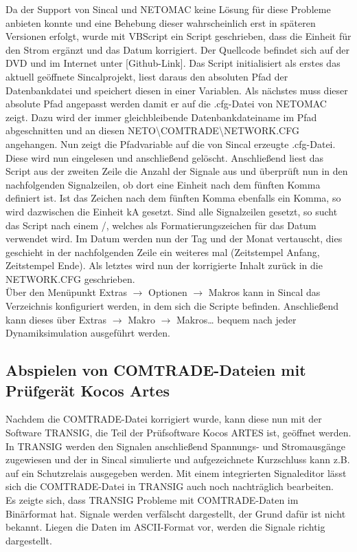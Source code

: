 \documentclass{scrartcl}
\begin{document}
\begin{onehalfspace}
Da der Support von Sincal und NETOMAC keine Lösung für diese Probleme anbieten konnte und eine Behebung dieser wahrscheinlich erst in späteren Versionen erfolgt, wurde mit VBScript ein Script geschrieben, dass die Einheit für den Strom ergänzt und das Datum korrigiert. Der Quellcode befindet sich auf der DVD und im Internet unter [Github-Link]. Das Script initialisiert als erstes das aktuell geöffnete Sincalprojekt, liest daraus den absoluten Pfad der Datenbankdatei und speichert diesen in einer Variablen. Als nächstes muss dieser absolute Pfad angepasst werden damit er auf die .cfg-Datei von NETOMAC zeigt. Dazu wird der immer gleichbleibende Datenbankdateiname im Pfad abgeschnitten und an diesen \glqq NETO\textbackslash COMTRADE\textbackslash NETWORK.CFG \grqq{} angehangen. Nun zeigt die Pfadvariable auf die von Sincal erzeugte .cfg-Datei. Diese wird nun eingelesen und anschließend gelöscht. Anschließend liest das Script aus der zweiten Zeile die Anzahl der Signale aus und überprüft nun in den nachfolgenden Signalzeilen, ob dort eine Einheit nach dem fünften Komma definiert ist. Ist das Zeichen nach dem fünften Komma ebenfalls ein Komma, so wird dazwischen die Einheit \glqq kA\grqq{} gesetzt. Sind alle Signalzeilen gesetzt, so sucht das Script nach einem \glqq /\grqq, welches als Formatierungszeichen für das Datum verwendet wird. Im Datum werden nun der Tag und der Monat vertauscht, dies geschieht in der nachfolgenden Zeile ein weiteres mal (Zeitstempel Anfang, Zeitstempel Ende). Als letztes wird nun der korrigierte Inhalt zurück in die NETWORK.CFG geschrieben. \\
Über den Menüpunkt Extras $\rightarrow$ Optionen $\rightarrow$ Makros kann in Sincal das Verzeichnis konfiguriert werden, in dem sich die Scripte befinden. Anschließend kann dieses über Extras $\rightarrow$ Makro $\rightarrow$ Makros… bequem nach jeder Dynamiksimulation ausgeführt werden.

\subsection{Abspielen von COMTRADE-Dateien mit Prüfgerät Kocos Artes}
Nachdem die COMTRADE-Datei korrigiert wurde, kann diese nun mit der Software TRANSIG, die Teil der Prüfsoftware Kocos ARTES ist, geöffnet werden. In TRANSIG werden den Signalen anschließend Spannungs- und Stromausgänge zugewiesen und der in Sincal simulierte und aufgezeichnete Kurzschluss kann z.B. auf ein Schutzrelais ausgegeben werden. Mit einem integrierten Signaleditor lässt sich die COMTRADE-Datei in TRANSIG auch noch nachträglich bearbeiten. \\
Es zeigte sich, dass TRANSIG Probleme mit COMTRADE-Daten im Binärformat hat. Signale werden verfälscht dargestellt, der Grund dafür ist nicht bekannt. Liegen die Daten im ASCII-Format vor, werden die Signale richtig dargestellt.



\end{onehalfspace}
\end{document}
